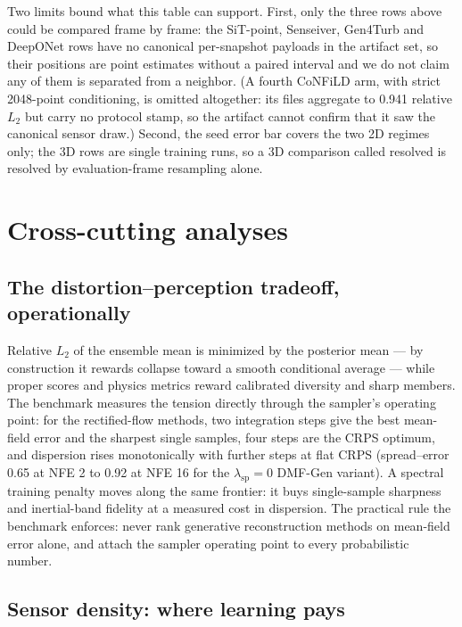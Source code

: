 \documentclass[aip,pof,reprint,amsmath,amssymb,superscriptaddress]{revtex4-1}
\newcommand{\dmfgen}{DMF-Gen}
\begin{document}
Two limits bound what this table can support. First, only the three rows
above could be compared frame by frame: the SiT-point, Senseiver, Gen4Turb and
DeepONet rows have no canonical per-snapshot payloads in the artifact set, so
their positions are point estimates without a paired interval and we do not
claim any of them is separated from a neighbor. (A fourth CoNFiLD arm, with
strict 2048-point conditioning, is omitted altogether: its files aggregate to
0.941 relative $L_2$ but carry no protocol stamp, so the artifact cannot
confirm that it saw the canonical sensor draw.) Second, the seed error bar
covers the two 2D regimes only; the 3D rows are single training runs, so a 3D
comparison called resolved is resolved by evaluation-frame resampling alone.

\section{Cross-cutting analyses}\label{sec:analysis}

\subsection{The distortion--perception tradeoff, operationally}\label{sec:dp}

Relative $L_2$ of the ensemble mean is minimized by the posterior mean --- by
construction it rewards collapse toward a smooth conditional average --- while
proper scores and physics metrics reward calibrated diversity and sharp
members. The benchmark measures the tension directly through the sampler's
operating point: for the rectified-flow methods, two integration steps give
the best mean-field error and the sharpest single samples, four steps are the
CRPS optimum, and dispersion rises monotonically with further steps at flat
CRPS (spread--error 0.65 at NFE 2 to 0.92 at NFE 16 for the
$\lambda_{\mathrm{sp}}{=}0$ \dmfgen{} variant). A spectral training penalty
moves along the same frontier: it buys single-sample sharpness and
inertial-band fidelity at a measured cost in dispersion. The practical rule
the benchmark enforces: never rank generative reconstruction methods on
mean-field error alone, and attach the sampler operating point to every
probabilistic number.

\subsection{Sensor density: where learning pays}\label{sec:density}
\end{document}
